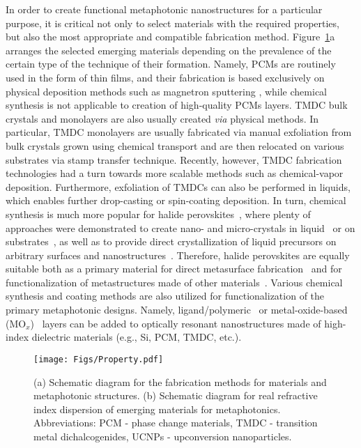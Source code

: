 \documentclass[journal=chreay,manuscript=review]{achemso}
\begin{document}
In order to create functional metaphotonic nanostructures for a particular purpose, it is critical not only to select materials with the required properties, but also the most appropriate and compatible fabrication method. Figure~\ref{fig:property}a arranges the selected emerging materials depending on the prevalence of the certain type of the technique of their formation. Namely, PCMs are routinely used in the form of thin films, and their fabrication is based exclusively on  physical deposition methods such as magnetron sputtering \cite{wang2016optically}, while chemical synthesis is not applicable to creation of high-quality PCMs layers. TMDC bulk crystals and monolayers are also usually created \textit{via} physical methods. In particular, TMDC monolayers are usually fabricated via manual exfoliation from bulk crystals grown using chemical transport \cite{ubaldini2013chloride} and are then relocated on various substrates via stamp transfer technique. Recently, however, TMDC fabrication technologies had a turn towards more scalable methods such as chemical-vapor deposition\cite{shree2019high}. Furthermore, exfoliation of TMDCs can also be performed in liquids\cite{coleman2011two}, which enables further drop-casting or spin-coating deposition. In turn, chemical synthesis is much more popular for halide perovskites~\cite{dunlap2018synthetic}, where plenty of approaches were demonstrated to create nano- and micro-crystals in liquid~\cite{dey2021state} or on substrates~\cite{im20116, pushkarev2018few}, as well as to provide direct crystallization of liquid precursors on arbitrary surfaces and nanostructures~\cite{liang1998synthesis,era1997self, barrows2014efficient}. Therefore, halide perovskites are equally suitable both as a primary material for direct metasurface fabrication~\cite{berestennikov2019active} and for functionalization of metastructures made of other materials~\cite{berestennikov2021enhanced}. Various chemical synthesis and coating methods are also utilized for functionalization of the primary metaphotonic designs. Namely, ligand/polymeric~\cite{staude2015shaping,chen2016functionalization,zyuzin2018photoluminescence,wu2020room} or metal-oxide-based (MO$_x$)~\cite{choi2015zinc, karvounis2020barium} layers can be added to optically resonant nanostructures made of high-index dielectric materials (e.g., Si, PCM, TMDC, etc.).



\begin{figure}[t!]
    \centering
    \texttt{[image: Figs/Property.pdf]}
    \caption{(a) Schematic diagram for the fabrication methods for materials and metaphotonic structures. (b) Schematic diagram for real refractive index dispersion of emerging materials for metaphotonics. Abbreviations: PCM - phase change materials, TMDC - transition metal dichalcogenides, UCNPs - upconversion nanoparticles.}
    \label{fig:property}
\end{figure}
\end{document}
